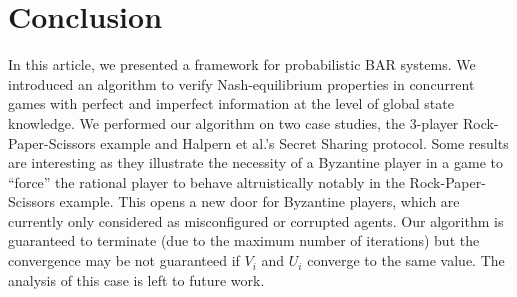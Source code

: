 \section{Conclusion}\label{sec:conclusion}
In this article, we presented a framework for probabilistic BAR systems. We introduced an algorithm to verify Nash-equilibrium properties in concurrent games with perfect and imperfect information at the level of global state knowledge. We performed our algorithm on two case studies, the 3-player Rock-Paper-Scissors example and Halpern et al.'s Secret Sharing protocol. Some results are interesting as they illustrate the necessity of a Byzantine player in a game to ``force'' the rational player to behave altruistically notably in the Rock-Paper-Scissors example. This opens a new door for Byzantine players, which are currently only considered as misconfigured or corrupted agents. Our algorithm is guaranteed to terminate (due to the maximum number of iterations) but the convergence may be not guaranteed if $V_i$ and $U_i$ converge to the same value. The analysis of this case is left to future work.